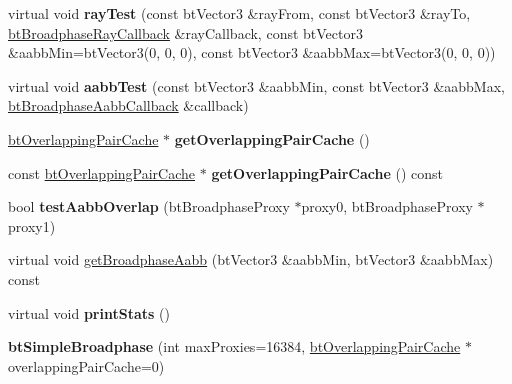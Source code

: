 \begin{DoxyCompactItemize}
\item 
\mbox{\label{classbtSimpleBroadphase_a1ceb9e591e39dcd013209f9b7d02c459}} 
virtual void {\bfseries ray\+Test} (const bt\+Vector3 \&ray\+From, const bt\+Vector3 \&ray\+To, \hyperlink{structbtBroadphaseRayCallback}{bt\+Broadphase\+Ray\+Callback} \&ray\+Callback, const bt\+Vector3 \&aabb\+Min=bt\+Vector3(0, 0, 0), const bt\+Vector3 \&aabb\+Max=bt\+Vector3(0, 0, 0))
\item 
\mbox{\label{classbtSimpleBroadphase_a1877ed249a848ec50705b61f52cdde9f}} 
virtual void {\bfseries aabb\+Test} (const bt\+Vector3 \&aabb\+Min, const bt\+Vector3 \&aabb\+Max, \hyperlink{structbtBroadphaseAabbCallback}{bt\+Broadphase\+Aabb\+Callback} \&callback)
\item 
\mbox{\label{classbtSimpleBroadphase_a66ea1c78dbf926e744716ca547cef831}} 
\hyperlink{classbtOverlappingPairCache}{bt\+Overlapping\+Pair\+Cache} $\ast$ {\bfseries get\+Overlapping\+Pair\+Cache} ()
\item 
\mbox{\label{classbtSimpleBroadphase_a21d44393fa6596f039ab04de47e43d6d}} 
const \hyperlink{classbtOverlappingPairCache}{bt\+Overlapping\+Pair\+Cache} $\ast$ {\bfseries get\+Overlapping\+Pair\+Cache} () const
\item 
\mbox{\label{classbtSimpleBroadphase_a377a57ae8d343194a75ac51d4e3c005a}} 
bool {\bfseries test\+Aabb\+Overlap} (bt\+Broadphase\+Proxy $\ast$proxy0, bt\+Broadphase\+Proxy $\ast$proxy1)
\item 
virtual void \hyperlink{classbtSimpleBroadphase_a4e8e5de5df6d3125631e3d94a67ac4d2}{get\+Broadphase\+Aabb} (bt\+Vector3 \&aabb\+Min, bt\+Vector3 \&aabb\+Max) const
\item 
\mbox{\label{classbtSimpleBroadphase_aa2697c7a6883ae3192ea1eeb64ded59c}} 
virtual void {\bfseries print\+Stats} ()
\item 
\mbox{\label{classbtSimpleBroadphase_ab9fe91cf132bed4e0e36073fc25e0e20}} 
{\bfseries bt\+Simple\+Broadphase} (int max\+Proxies=16384, \hyperlink{classbtOverlappingPairCache}{bt\+Overlapping\+Pair\+Cache} $\ast$overlapping\+Pair\+Cache=0)

\end{DoxyCompactItemize}
